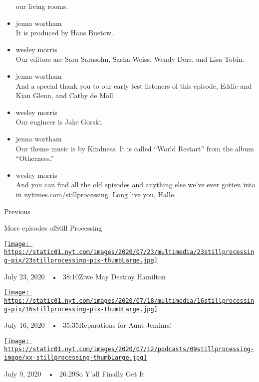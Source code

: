 \begin{itemize}
  our living rooms.
\item
  jenna wortham\\
  It is produced by Hans Buetow.
\item
  wesley morris\\
  Our editors are Sara Sarasohn, Sasha Weiss, Wendy Dorr, and Lisa
  Tobin.
\item
  jenna wortham\\
  And a special thank you to our early test listeners of this episode,
  Eddie and Kian Glenn, and Cathy de Moll.
\item
  wesley morris\\
  Our engineer is Jake Gorski.
\item
  jenna wortham\\
  Our theme music is by Kindness. It is called ``World Restart'' from
  the album ``Otherness.''
\item
  wesley morris\\
  And you can find all the old episodes and anything else we've ever
  gotten into in nytimes.com/stillprocessing. Long live you, Halle.
\end{itemize}

Previous

More episodes ofStill Processing

\href{https://www.nytimes.com/2020/07/23/podcasts/hamilton-ziwe-discomfort.html?action=click\&module=audio-series-bar\&region=header\&pgtype=Article}{\texttt{[image: https://static01.nyt.com/images/2020/07/23/multimedia/23stillprocessing-pix/23stillprocessing-pix-thumbLarge.jpg]}}

July 23, 2020~~•~ 38:10Ziwe May Destroy Hamilton

\href{https://www.nytimes.com/2020/07/16/podcasts/reparations-for-aunt-jemima.html?action=click\&module=audio-series-bar\&region=header\&pgtype=Article}{\texttt{[image: https://static01.nyt.com/images/2020/07/18/multimedia/16stillprocessing-pix/16stillprocessing-pix-thumbLarge.jpg]}}

July 16, 2020~~•~ 35:35Reparations for Aunt Jemima!

\href{https://www.nytimes.com/2020/07/09/podcasts/still-processing-black-lives-matter.html?action=click\&module=audio-series-bar\&region=header\&pgtype=Article}{\texttt{[image: https://static01.nyt.com/images/2020/07/12/podcasts/09stillprocessing-image/xx-stillprocessing-thumbLarge.jpg]}}

July 9, 2020~~•~ 26:29So Y'all Finally Get It

